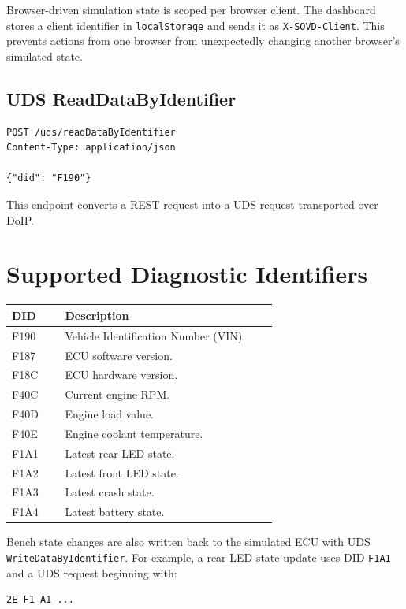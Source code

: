 \documentclass[a4paper,10pt,titlepage,oneside]{article}
\begin{document}
Browser-driven simulation state is scoped per browser client. The dashboard
stores a client identifier in \texttt{localStorage} and sends it as
\texttt{X-SOVD-Client}. This prevents actions from one browser from unexpectedly
changing another browser's simulated state.

\subsection{UDS ReadDataByIdentifier}

\begin{lstlisting}
POST /uds/readDataByIdentifier
Content-Type: application/json

{"did": "F190"}
\end{lstlisting}

This endpoint converts a REST request into a UDS request transported over DoIP.

\section{Supported Diagnostic Identifiers}

\begin{longtable}{>{\ttfamily}p{0.18\linewidth} p{0.72\linewidth}}
\textbf{DID} & \textbf{Description} \\
\hline
F190 & Vehicle Identification Number (VIN). \\
F187 & ECU software version. \\
F18C & ECU hardware version. \\
F40C & Current engine RPM. \\
F40D & Engine load value. \\
F40E & Engine coolant temperature. \\
F1A1 & Latest rear LED state. \\
F1A2 & Latest front LED state. \\
F1A3 & Latest crash state. \\
F1A4 & Latest battery state. \\
\end{longtable}

Bench state changes are also written back to the simulated ECU with UDS
\texttt{WriteDataByIdentifier}. For example, a rear LED state update uses DID
\texttt{F1A1} and a UDS request beginning with:

\begin{lstlisting}
2E F1 A1 ...
\end{lstlisting}
\end{document}
